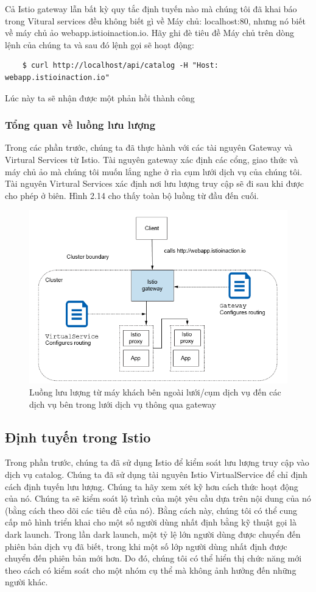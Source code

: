 \documentclass[12pt,a4paper]{report}
\begin{document}
Cả Istio gateway lẫn bất kỳ quy tắc định tuyến nào mà chúng tôi đã khai báo trong Vỉtural services đều không biết gì về Máy chủ: localhost:80, nhưng nó biết về máy chủ ảo webapp.istioinaction.io. Hãy ghi đè tiêu đề Máy chủ trên dòng lệnh của chúng ta và sau đó lệnh gọi sẽ hoạt động:
\begin{lstlisting}
	$ curl http://localhost/api/catalog -H "Host: webapp.istioinaction.io"
\end{lstlisting}

Lúc này ta sẽ nhận được một phản hồi thành công

			\subsubsection{Tổng quan về luồng lưu lượng}
\hspace{0.6cm}Trong các phần trước, chúng ta đã thực hành với các tài nguyên Gateway và Virtural Services từ Istio. Tài nguyên gateway xác định các cổng, giao thức và máy chủ ảo mà chúng tôi muốn lắng nghe ở rìa cụm lưới dịch vụ của chúng tôi. Tài nguyên Virtural Services xác định nơi lưu lượng truy cập sẽ đi sau khi được cho phép ở biên. Hình 2.14 cho thấy toàn bộ luồng từ đầu đến cuối.
\begin{figure}[h]
	\centering
	\includegraphics[width=0.7\linewidth]{Pics/2.2.1-p5}
	\caption{Luồng lưu lượng từ máy khách bên ngoài lưới/cụm dịch vụ đến các dịch vụ bên trong lưới dịch vụ thông qua gateway}
	\label{fig:2.2.1-5}
\end{figure}
		\subsection{Định tuyến trong Istio}
\hspace{0.6cm}Trong phần trước, chúng ta đã sử dụng Istio để kiểm soát lưu lượng truy cập vào dịch vụ catalog. Chúng ta đã sử dụng tài nguyên Istio VirtualService để chỉ định cách định tuyến lưu lượng. Chúng ta hãy xem xét kỹ hơn cách thức hoạt động của nó. Chúng ta sẽ kiểm soát lộ trình của một yêu cầu dựa trên nội dung của nó (bằng cách theo dõi các tiêu đề của nó). Bằng cách này, chúng tôi có thể cung cấp mô hình triển khai cho một số người dùng nhất định bằng kỹ thuật gọi là dark launch. Trong lần dark launch, một tỷ lệ lớn người dùng được chuyển đến phiên bản dịch vụ đã biết, trong khi một số lớp người dùng nhất định được chuyển đến phiên bản mới hơn. Do đó, chúng tôi có thể hiển thị chức năng mới theo cách có kiểm soát cho một nhóm cụ thể mà không ảnh hưởng đến những người khác.
\end{document}
